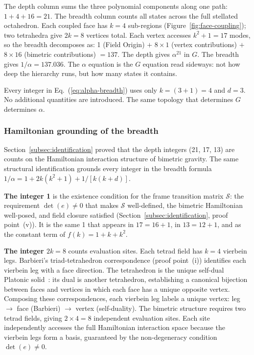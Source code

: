 \documentclass[aps,prd,preprint,superscriptaddress,showpacs,preprintnumbers,amsmath,amssymb,nofootinbib]{revtex4-2}
\begin{document}
\noindent
The depth column sums the three polynomial components along one path: $1 + 4 + 16 = 21$. The breadth column counts all states across the full stellated octahedron. Each coupled face has $k = 4$ sub-regions (Figure~\ref{fig:face-coupling}); two tetrahedra give $2k = 8$ vertices total. Each vertex accesses $k^2 + 1 = 17$ modes, so the breadth decomposes as: 1 (Field Origin) $+$ $8 \times 1$ (vertex contributions) $+$ $8 \times 16$ (bimetric contributions) $= 137$. The depth gives $\alpha^{21}$ in $G$. The breadth gives $1/\alpha = 137.036$. The $\alpha$ equation is the $G$ equation read sideways: not how deep the hierarchy runs, but how many states it contains.

Every integer in Eq.~(\ref{eq:alpha-breadth}) uses only $k = (3{+}1) = 4$ and $d = 3$. No additional quantities are introduced. The same topology that determines $G$ determines $\alpha$.

\subsubsection*{Hamiltonian grounding of the breadth}

Section~\ref{subsec:identification} proved that the depth integers (21, 17, 13) are counts on the Hamiltonian interaction structure of bimetric gravity. The same structural identification grounds every integer in the breadth formula $1/\alpha = 1 + 2k(k^2 + 1) + 1/[k(k{+}d)]$.

\textbf{The integer 1} is the existence condition for the frame transition matrix $\mathcal{S}$: the requirement $\det(e) \neq 0$ that makes $\mathcal{S}$ well-defined, the bimetric Hamiltonian well-posed, and field closure satisfied (Section~\ref{subsec:identification}, proof point~(v)). It is the same 1 that appears in $17 = 16 + 1$, in $13 = 12 + 1$, and as the constant term of $f(k) = 1 + k + k^2$.

\textbf{The integer $2k = 8$} counts evaluation sites. Each tetrad field has $k = 4$ vierbein legs. Barbieri's triad-tetrahedron correspondence (proof point~(i)) identifies each vierbein leg with a face direction. The tetrahedron is the unique self-dual Platonic solid~\cite{coxeter1973}: its dual is another tetrahedron, establishing a canonical bijection between faces and vertices in which each face has a unique opposite vertex. Composing these correspondences, each vierbein leg labels a unique vertex: leg $\to$ face (Barbieri) $\to$ vertex (self-duality). The bimetric structure requires two tetrad fields, giving $2 \times 4 = 8$ independent evaluation sites. Each site independently accesses the full Hamiltonian interaction space because the vierbein legs form a basis, guaranteed by the non-degeneracy condition $\det(e) \neq 0$.
\end{document}
